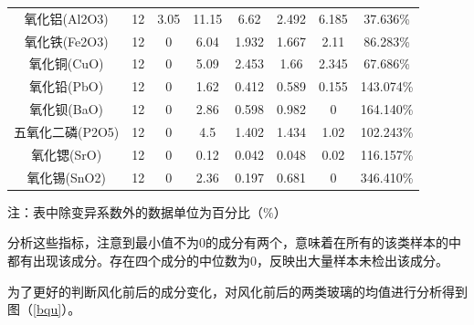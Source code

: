 \documentclass{my_paper}
\begin{document}
\begin{table}[ht]
\begin{tabular}{cccccccc}
氧化铝(Al2O3)           & 12                   & 3.05                 & 11.15                & 6.62                 & 2.492                & 6.185                & 37.636\%             \\
氧化铁(Fe2O3)           & 12                   & 0                    & 6.04                 & 1.932                & 1.667                & 2.11                 & 86.283\%             \\
氧化铜(CuO)             & 12                   & 0                    & 5.09                 & 2.453                & 1.66                 & 2.345                & 67.686\%             \\
氧化铅(PbO)             & 12                   & 0                    & 1.62                 & 0.412                & 0.589                & 0.155                & 143.074\%            \\
氧化钡(BaO)             & 12                   & 0                    & 2.86                 & 0.598                & 0.982                & 0                    & 164.140\%            \\
五氧化二磷(P2O5)          & 12                   & 0                    & 4.5                  & 1.402                & 1.434                & 1.02                 & 102.243\%            \\
氧化锶(SrO)             & 12                   & 0                    & 0.12                 & 0.042                & 0.048                & 0.02                 & 116.157\%            \\
氧化锡(SnO2)            & 12                   & 0                    & 2.36                 & 0.197                & 0.681                & 0                    & 346.410\%            \\
    \bottomrule
      \end{tabular}
    \label{index1}

    注：表中除变异系数外的数据单位为百分比（$\%$）
      \end{table}
分析这些指标，注意到最小值不为$0$的成分有两个，意味着在所有的该类样本的中都有出现该成分。存在四个成分的中位数为0，反映出大量样本未检出该成分。

\newpage
为了更好的判断风化前后的成分变化，对风化前后的两类玻璃的均值进行分析得到图（\ref{bqu}）。
\end{document}
